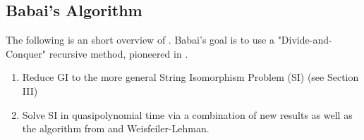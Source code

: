 \subsection{Babai's Algorithm}
The following is an short overview of \cite{babai2016,babai2018}. Babai's goal is to use a "Divide-and-Conquer" recursive method, pioneered in \cite{luks1982}. 
\begin{enumerate}
	\item Reduce GI to the more general String Isomorphism Problem (SI) (see Section III)
	\item Solve SI in quasipolynomial time via a combination of new results as well as the algorithm from \cite{luks1982} and Weisfeiler-Lehman.
\end{enumerate}